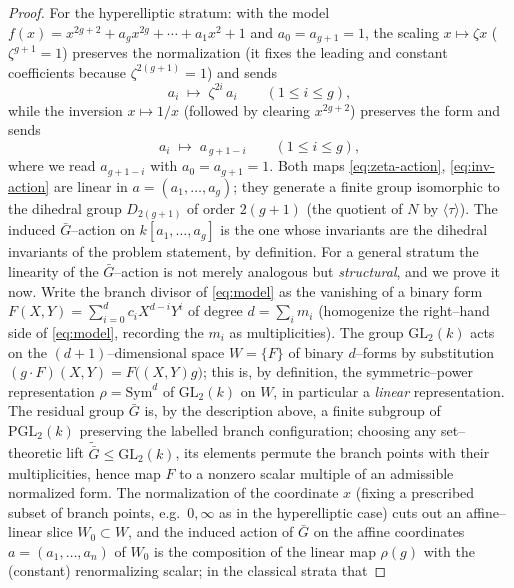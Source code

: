 \documentclass{amsart}
\theoremstyle{definition}
\begin{document}
\begin{proof}
For the hyperelliptic stratum: with the model
$f(x)=x^{2g+2}+a_g x^{2g}+\cdots+a_1 x^2+1$ and $a_0=a_{g+1}=1$, the scaling
$x\mapsto\zeta x$ ($\zeta^{g+1}=1$) preserves the normalization (it fixes the
leading and constant coefficients because $\zeta^{2(g+1)}=1$) and sends
\begin{equation}\label{eq:zeta-action}
 a_i\;\longmapsto\;\zeta^{2i}\,a_i \qquad(1\le i\le g),
\end{equation}
while the inversion $x\mapsto 1/x$ (followed by clearing $x^{2g+2}$) preserves the
form and sends
\begin{equation}\label{eq:inv-action}
 a_i\;\longmapsto\;a_{\,g+1-i}\qquad(1\le i\le g),
\end{equation}
where we read $a_{g+1-i}$ with $a_0=a_{g+1}=1$. Both maps \eqref{eq:zeta-action},
\eqref{eq:inv-action} are linear in $a=(a_1,\dots,a_g)$; they generate a finite
group isomorphic to the dihedral group $D_{2(g+1)}$ of order $2(g+1)$ (the
quotient of $N$ by $\langle\tau\rangle$). The induced $\bar G$--action on
$k[a_1,\dots,a_g]$ is the one whose invariants are the dihedral invariants of the
problem statement, by definition. For a general stratum the linearity of the $\bar G$--action is not merely
analogous but \emph{structural}, and we prove it now. Write the branch divisor of
\eqref{eq:model} as the vanishing of a binary form
$F(X,Y)=\sum_{i=0}^{d} c_i X^{d-i}Y^{i}$ of degree $d=\sum_i m_i$ (homogenize the
right--hand side of \eqref{eq:model}, recording the $m_i$ as multiplicities).
The group $\mathrm{GL}_2(k)$ acts on the $(d{+}1)$--dimensional space
$W=\{F\}$ of binary $d$--forms by substitution
$(g\cdot F)(X,Y)=F\bigl((X,Y)g\bigr)$; this is, by definition, the symmetric--power
representation $\rho=\mathrm{Sym}^{d}$ of $\mathrm{GL}_2(k)$ on $W$, in particular a
\emph{linear} representation. The residual group $\bar G$ is, by the description
above, a finite subgroup of $\mathrm{PGL}_2(k)$ preserving the labelled branch
configuration; choosing any set--theoretic lift
$\widetilde{\bar G}\le\mathrm{GL}_2(k)$, its elements permute the branch points with
their multiplicities, hence map $F$ to a nonzero scalar multiple of an admissible
normalized form. The normalization of the coordinate $x$ (fixing a prescribed subset
of branch points, e.g.\ $0,\infty$ as in the hyperelliptic case) cuts out an
affine--linear slice $W_0\subset W$, and the induced action of $\bar G$ on the affine
coordinates $a=(a_1,\dots,a_n)$ of $W_0$ is the composition of the linear map
$\rho(g)$ with the (constant) renormalizing scalar; in the classical strata that

\end{proof}
\end{document}
